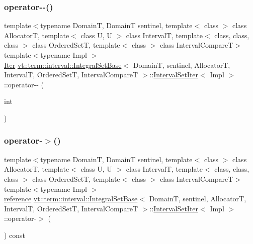 \subsubsection{\texorpdfstring{operator-\/-\/()}{operator--()}\hspace{0.1cm}{\footnotesize\ttfamily [2/2]}}
{\footnotesize\ttfamily template$<$typename DomainT, DomainT sentinel, template$<$ class $>$ class AllocatorT, template$<$ class U, U $>$ class IntervalT, template$<$ class, class, class $>$ class Ordered\+SetT, template$<$ class $>$ class Interval\+CompareT$>$ \\
template$<$typename Impl $>$ \\
\hyperlink{structvt_1_1term_1_1interval_1_1_integral_set_base_1_1_interval_set_iter_a4056b2dcca9f60143d2d76387599e6e1}{Iter} \hyperlink{structvt_1_1term_1_1interval_1_1_integral_set_base}{vt\+::term\+::interval\+::\+Integral\+Set\+Base}$<$ DomainT, sentinel, AllocatorT, IntervalT, Ordered\+SetT, Interval\+CompareT $>$\+::\hyperlink{structvt_1_1term_1_1interval_1_1_integral_set_base_1_1_interval_set_iter}{Interval\+Set\+Iter}$<$ Impl $>$\+::operator-\/-\/ (\begin{DoxyParamCaption}\item[{int}]{ }\end{DoxyParamCaption})\hspace{0.3cm}{\ttfamily [inline]}}

\mbox{\label{structvt_1_1term_1_1interval_1_1_integral_set_base_1_1_interval_set_iter_ab5c26e34018f1157d210a3ebc29afd3a}} 
\subsubsection{\texorpdfstring{operator-\/$>$()}{operator->()}}
{\footnotesize\ttfamily template$<$typename DomainT, DomainT sentinel, template$<$ class $>$ class AllocatorT, template$<$ class U, U $>$ class IntervalT, template$<$ class, class, class $>$ class Ordered\+SetT, template$<$ class $>$ class Interval\+CompareT$>$ \\
template$<$typename Impl $>$ \\
\hyperlink{structvt_1_1term_1_1interval_1_1_integral_set_base_1_1_interval_set_iter_a59b5e1223198deaeacb85051517dd80a}{reference} \hyperlink{structvt_1_1term_1_1interval_1_1_integral_set_base}{vt\+::term\+::interval\+::\+Integral\+Set\+Base}$<$ DomainT, sentinel, AllocatorT, IntervalT, Ordered\+SetT, Interval\+CompareT $>$\+::\hyperlink{structvt_1_1term_1_1interval_1_1_integral_set_base_1_1_interval_set_iter}{Interval\+Set\+Iter}$<$ Impl $>$\+::operator-\/$>$ (\begin{DoxyParamCaption}{ }\end{DoxyParamCaption}) const\hspace{0.3cm}{\ttfamily [inline]}}

